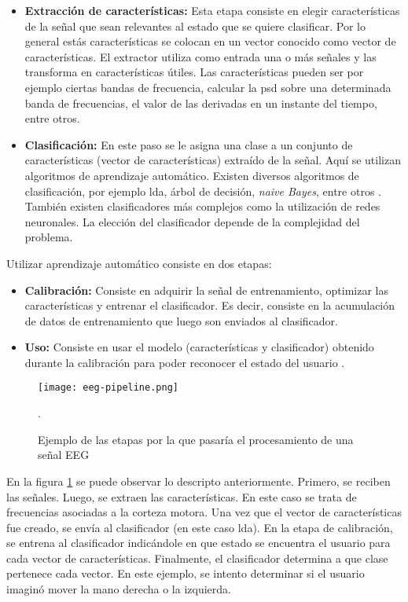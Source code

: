 \begin{itemize}
  \item \textbf{Extracción de características:} Esta etapa consiste en elegir características de la señal que sean relevantes al estado que se quiere clasificar. Por lo general estás características se colocan en un vector conocido como vector de características. El extractor utiliza como entrada una o más señales y las transforma en características útiles. Las características pueden ser por ejemplo ciertas bandas de frecuencia, calcular la \acrshort{psd} sobre una determinada banda de frecuencias, el valor de las derivadas en un instante del tiempo, entre otros. 
  \item \textbf{Clasificación:} En este paso se le asigna una clase a un conjunto de características (vector de características) extraído de la señal. Aquí se utilizan algoritmos de aprendizaje automático. Existen diversos algoritmos de clasificación, por ejemplo \gls{lda}, árbol de decisión, \emph{naive Bayes}, entre otros \cite{eeg-tutorial}. También existen clasificadores más complejos como la utilización de redes neuronales. La elección del clasificador depende de la complejidad del problema.
\end{itemize}

Utilizar aprendizaje automático consiste en dos etapas:

\begin{itemize}
	\item \textbf{Calibración:} Consiste en adquirir la señal de entrenamiento, optimizar las características y entrenar el clasificador. Es decir, consiste en la acumulación de datos de entrenamiento que luego son enviados al clasificador.
	\item \textbf{Uso:} Consiste en usar el modelo (características y clasificador) obtenido durante la calibración para poder reconocer el estado del usuario \cite{eeg-tutorial}. 
\end{itemize}

\begin{figure}[H]
	\centering
    \texttt{[image: eeg-pipeline.png]}
    \caption{Ejemplo de las etapas por la que pasaría el procesamiento de una señal EEG \cite{eeg-tutorial}}.
	\label{fig:eeg-pipeline}
\end{figure}

En la figura \ref{fig:eeg-pipeline} se puede observar lo descripto anteriormente. Primero, se reciben las señales. Luego, se extraen las características. En este caso se trata de frecuencias asociadas a la corteza motora. Una vez que el vector de características fue creado, se envía al clasificador (en este caso \acrshort{lda}). En la etapa de calibración, se entrena al clasificador indicándole en que estado se encuentra el usuario para cada vector de características.  Finalmente, el clasificador determina a que clase pertenece cada vector. En este ejemplo, se intento determinar si el usuario imaginó mover la mano derecha o la izquierda. 


